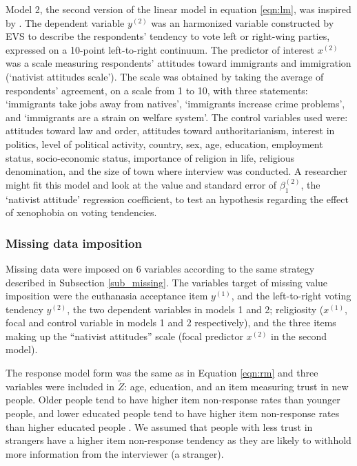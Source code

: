 	Model 2, the second version of the linear model in equation \ref{eqn:lm}, was inspired by \cite{immerzeel:2015}.
	The dependent variable $y^{(2)}$ was an harmonized variable constructed by EVS to describe the respondents' 
	tendency to vote left or right-wing parties, expressed on a 10-point left-to-right continuum.
	The predictor of interest $x^{(2)}$ was a scale measuring respondents' attitudes toward immigrants and immigration 
	(`nativist attitudes scale').
	The scale was obtained by taking the average of respondents' agreement, on a scale from 1 to 10, with three 
	statements: `immigrants take jobs away from natives', `immigrants increase crime problems', and 
	`immigrants are a strain on welfare system'.
	The control variables used were: 
	attitudes toward law and order, attitudes toward authoritarianism, interest in politics, level of political activity,  
	country, sex, age, education, employment status, socio-economic status, importance of religion in life, 
	religious denomination, and the size of town where interview was conducted.
	A researcher might fit this model and look at the value and standard error of $\beta^{(2)}_{1}$, 
	the `nativist attitude' regression coefficient, to test an hypothesis regarding the effect of xenophobia on voting 
	tendencies.

\subsubsection{Missing data imposition}

	Missing data were imposed on 6 variables according to the same strategy described in Subsection \ref{sub_missing}.
	The variables target of missing value imposition were the euthanasia acceptance item $y^{(1)}$, and the 
	left-to-right voting tendency $y^{(2)}$, the two dependent variables in models 1 and 2; 
	religiosity ($x^{(1)}$, focal and control variable in models 1 and 2 respectively), 
	and the three items making up the ``nativist attitudes'' scale (focal predictor $x^{(2)}$
	in the second model).

	The response model form was the same as in Equation \eqref{eqn:rm} and three variables were included in $\tilde{Z}$: 
	age, education, and an item measuring trust in new people. 
	Older people tend to have higher item non-response rates than younger people, and 
	lower educated people tend to have higher item non-response rates than higher educated people 
	\citep{guadagnoliCleary:1992, leeuwEtAl:2003}.
	We assumed that people with less trust in strangers have a higher item non-response tendency as 
	they are likely to withhold more information from the interviewer (a stranger).

